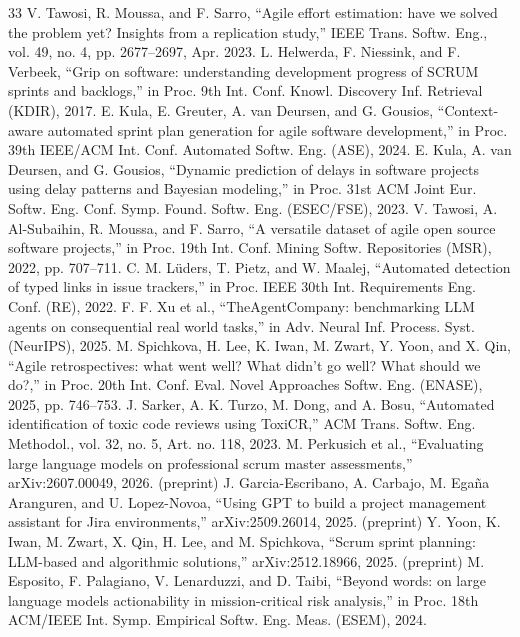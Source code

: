 \documentclass[conference]{IEEEtran}
\begin{document}
\begin{thebibliography}{33}
 V. Tawosi, R. Moussa, and F. Sarro, ``Agile effort estimation: have we solved the problem yet? Insights from a replication study,'' IEEE Trans. Softw. Eng., vol. 49, no. 4, pp. 2677--2697, Apr. 2023.
 L. Helwerda, F. Niessink, and F. Verbeek, ``Grip on software: understanding development progress of SCRUM sprints and backlogs,'' in Proc. 9th Int. Conf. Knowl. Discovery Inf. Retrieval (KDIR), 2017.
 E. Kula, E. Greuter, A. van Deursen, and G. Gousios, ``Context-aware automated sprint plan generation for agile software development,'' in Proc. 39th IEEE/ACM Int. Conf. Automated Softw. Eng. (ASE), 2024.
 E. Kula, A. van Deursen, and G. Gousios, ``Dynamic prediction of delays in software projects using delay patterns and Bayesian modeling,'' in Proc. 31st ACM Joint Eur. Softw. Eng. Conf. Symp. Found. Softw. Eng. (ESEC/FSE), 2023.
 V. Tawosi, A. Al-Subaihin, R. Moussa, and F. Sarro, ``A versatile dataset of agile open source software projects,'' in Proc. 19th Int. Conf. Mining Softw. Repositories (MSR), 2022, pp. 707--711.
 C. M. Lüders, T. Pietz, and W. Maalej, ``Automated detection of typed links in issue trackers,'' in Proc. IEEE 30th Int. Requirements Eng. Conf. (RE), 2022.
 F. F. Xu et al., ``TheAgentCompany: benchmarking LLM agents on consequential real world tasks,'' in Adv. Neural Inf. Process. Syst. (NeurIPS), 2025.
 M. Spichkova, H. Lee, K. Iwan, M. Zwart, Y. Yoon, and X. Qin, ``Agile retrospectives: what went well? What didn't go well? What should we do?,'' in Proc. 20th Int. Conf. Eval. Novel Approaches Softw. Eng. (ENASE), 2025, pp. 746--753.
 J. Sarker, A. K. Turzo, M. Dong, and A. Bosu, ``Automated identification of toxic code reviews using ToxiCR,'' ACM Trans. Softw. Eng. Methodol., vol. 32, no. 5, Art. no. 118, 2023.
 M. Perkusich et al., ``Evaluating large language models on professional scrum master assessments,'' arXiv:2607.00049, 2026. (preprint)
 J. Garcia-Escribano, A. Carbajo, M. Egaña Aranguren, and U. Lopez-Novoa, ``Using GPT to build a project management assistant for Jira environments,'' arXiv:2509.26014, 2025. (preprint)
 Y. Yoon, K. Iwan, M. Zwart, X. Qin, H. Lee, and M. Spichkova, ``Scrum sprint planning: LLM-based and algorithmic solutions,'' arXiv:2512.18966, 2025. (preprint)
 M. Esposito, F. Palagiano, V. Lenarduzzi, and D. Taibi, ``Beyond words: on large language models actionability in mission-critical risk analysis,'' in Proc. 18th ACM/IEEE Int. Symp. Empirical Softw. Eng. Meas. (ESEM), 2024.

\end{thebibliography}
\end{document}
